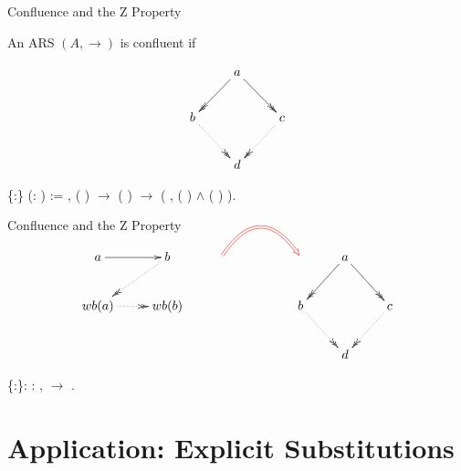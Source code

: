 \documentclass[10pt]{beamer}
\begin{document}
\begin{frame}[fragile]{Confluence and the Z Property}
  
  \begin{definition}[Confluence]
    An ARS $(A,\to)$ is confluent if
    
    \[
      \xymatrix{
        & a \ar@{->>}[dl] \ar@{->>}[dr] & \\
        b \ar@{.>>}[dr] &  & c \ar@{.>>}[dl] \\
        & d & 
      }
    \]
  \end{definition}
  
  \begin{coqdoccode}
      \{:\} (:  ) := \coqdockw{\ensuremath{\forall}}   , ( )   \ensuremath{\rightarrow} ( )   \ensuremath{\rightarrow} (\coqdoctac{\ensuremath{\exists}} , ( )   \ensuremath{\land} ( )  ).\coqdoceol
  \end{coqdoccode}
\end{frame}

\begin{frame}[fragile]{Confluence and the Z Property}
  
  \[
    \xymatrix{
      a \ar[r] &  b \ar@{.>>}[dl] & \ar@/^2.0pc/@{=>}@[red][rr] & &    & a \ar@{->>}[dl] \ar@{->>}[dr] & \\ 
      wb(a) \ar@{.>>}[r] & wb(b) & & &   b \ar@{.>>}[dr] &  & c \ar@{.>>}[dl] \\
      & & & &       & d & 
            }
  \]
  
  \begin{coqdoccode}
      \{:\}: \coqdockw{\ensuremath{\forall}} :  ,   \ensuremath{\rightarrow}  .\coqdoceol
  \end{coqdoccode}
\end{frame}

\section{Application: Explicit Substitutions}
\end{document}
